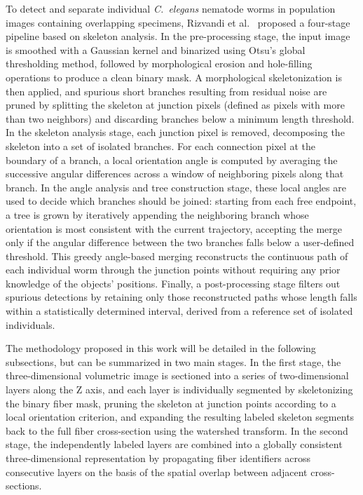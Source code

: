 To detect and separate individual \textit{C.\ elegans} nematode worms in population images containing overlapping specimens, Rizvandi et al.\ \cite{rizvandi} proposed a four-stage pipeline based on skeleton analysis. In the pre-processing stage, the input image is smoothed with a Gaussian kernel and binarized using Otsu's global thresholding method, followed by morphological erosion and hole-filling operations to produce a clean binary mask. A morphological skeletonization is then applied, and spurious short branches resulting from residual noise are pruned by splitting the skeleton at junction pixels (defined as pixels with more than two neighbors) and discarding branches below a minimum length threshold. In the skeleton analysis stage, each junction pixel is removed, decomposing the skeleton into a set of isolated branches. For each connection pixel at the boundary of a branch, a local orientation angle is computed by averaging the successive angular differences across a window of neighboring pixels along that branch. In the angle analysis and tree construction stage, these local angles are used to decide which branches should be joined: starting from each free endpoint, a tree is grown by iteratively appending the neighboring branch whose orientation is most consistent with the current trajectory, accepting the merge only if the angular difference between the two branches falls below a user-defined threshold. This greedy angle-based merging reconstructs the continuous path of each individual worm through the junction points without requiring any prior knowledge of the objects' positions. Finally, a post-processing stage filters out spurious detections by retaining only those reconstructed paths whose length falls within a statistically determined interval, derived from a reference set of isolated individuals.

The methodology proposed in this work will be detailed in the following subsections, but can be summarized in two main stages. In the first stage, the three-dimensional volumetric image is sectioned into a series of two-dimensional layers along the Z axis, and each layer is individually segmented by skeletonizing the binary fiber mask, pruning the skeleton at junction points according to a local orientation criterion, and expanding the resulting labeled skeleton segments back to the full fiber cross-section using the watershed transform. In the second stage, the independently labeled layers are combined into a globally consistent three-dimensional representation by propagating fiber identifiers across consecutive layers on the basis of the spatial overlap between adjacent cross-sections.

